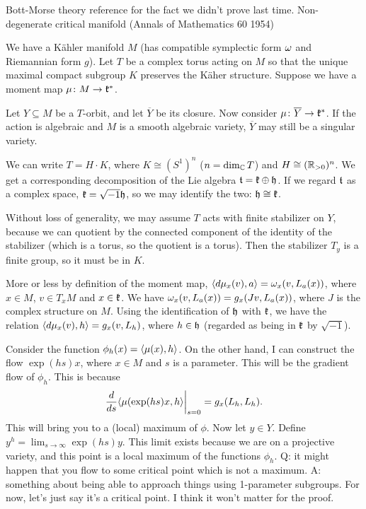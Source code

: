 
Bott-Morse theory reference for the fact we didn't prove last time. Non-degenerate critical manifold (Annals of Mathematics 60 1954)

We have a K\"ahler manifold $M$ (has compatible symplectic form $\omega$ and Riemannian form $g$). Let $T$ be a complex torus acting on $M$ so that the unique maximal compact subgroup $K$ preserves the K\"aher structure. Suppose we have a moment map $\mu\colon M\to \mathfrak{k}^*$.

Let $Y\subseteq M$ be a $T$-orbit, and let $\overline Y$ be its closure. Now consider $\mu\colon \overline Y\to \mathfrak{k}^*$. If the action is algebraic and $M$ is a smooth algebraic variety, $\overline Y$ may still be a singular variety.

We can write $T=H\cdot K$, where $K\cong (S^1)^n$ ($n=\dim_{\mathbb{C}} T$) and $H\cong (\mathbb{R}_{>0})^n$. We get a corresponding decomposition of the Lie algebra $\mathfrak{t}=\mathfrak{k}\oplus \mathfrak{h}$. If we regard $\mathfrak{t}$ as a complex space, $\mathfrak{k}=\sqrt{-1} \mathfrak{h}$, so we may identify the two: $\mathfrak{h}\cong \mathfrak{k}$.

Without loss of generality, we may assume $T$ acts with finite stabilizer on $Y$, because we can quotient by the connected component of the identity of the stabilizer (which is a torus, so the quotient is a torus). Then the stabilizer $T_y$ is a finite group, so it must be in $K$. 

More or less by definition of the moment map, $\langle d\mu_x(v),a\rangle=\omega_x(v,L_a(x))$, where $x\in M$, $v\in T_xM$ and $x\in\mathfrak{k}$. We have $\omega_x(v,L_a(x))=g_x(Jv,L_a(x))$, where $J$ is the complex structure on $M$. Using the identification of $\mathfrak{h}$ with $\mathfrak{k}$, we have the relation $\langle d\mu_x(v),h\rangle=g_x(v,L_h)$, where $h\in \mathfrak{h}$ (regarded as being in $\mathfrak{k}$ by $\sqrt{-1}$).

Consider the function $\phi_h(x)=\langle\mu(x),h\rangle$. On the other hand, I can construct the flow $\exp(hs)x$, where $x\in M$ and $s$ is a parameter. This will be the gradient flow of $\phi_h$. This is because
\[
 \frac{d }{d s}\langle\mu(\exp(hs)x,h\rangle\biggr|_{s=0} = g_x(L_h,L_h).
\]
This will bring you to a (local) maximum of $\phi$. Now let $y\in Y$. Define $y^h=\lim_{s\to \infty}\exp(hs)y$. This limit exists because we are on a projective variety, and this point is a local maximum of the functions $\phi_h$. Q: it might happen that you flow to some critical point which is not a maximum. A: something about being able to approach things using 1-parameter subgroups. For now, let's just say it's a critical point. I think it won't matter for the proof.

